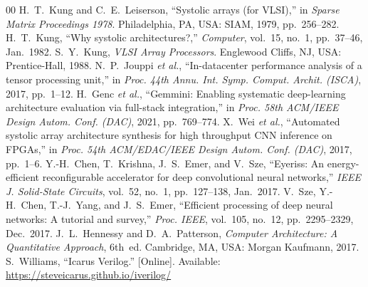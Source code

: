 \documentclass[conference]{IEEEtran}
\begin{document}
\begin{thebibliography}{00}
 H.~T.~Kung and C.~E.~Leiserson, ``Systolic arrays (for
VLSI),'' in \emph{Sparse Matrix Proceedings 1978}. Philadelphia, PA, USA: SIAM,
1979, pp.~256--282.
 H.~T.~Kung, ``Why systolic architectures?,''
\emph{Computer}, vol.~15, no.~1, pp.~37--46, Jan.~1982.
 S.~Y.~Kung, \emph{VLSI Array Processors}. Englewood Cliffs,
NJ, USA: Prentice-Hall, 1988.
 N.~P.~Jouppi \emph{et al.}, ``In-datacenter performance analysis
of a tensor processing unit,'' in \emph{Proc. 44th Annu. Int. Symp. Comput.
Archit. (ISCA)}, 2017, pp.~1--12.
 H.~Genc \emph{et al.}, ``Gemmini: Enabling systematic
deep-learning architecture evaluation via full-stack integration,'' in
\emph{Proc. 58th ACM/IEEE Design Autom. Conf. (DAC)}, 2021, pp.~769--774.
 X.~Wei \emph{et al.}, ``Automated systolic array architecture
synthesis for high throughput CNN inference on FPGAs,'' in \emph{Proc. 54th
ACM/EDAC/IEEE Design Autom. Conf. (DAC)}, 2017, pp.~1--6.
 Y.-H.~Chen, T.~Krishna, J.~S.~Emer, and V.~Sze, ``Eyeriss: An
energy-efficient reconfigurable accelerator for deep convolutional neural
networks,'' \emph{IEEE J. Solid-State Circuits}, vol.~52, no.~1, pp.~127--138,
Jan.~2017.
 V.~Sze, Y.-H.~Chen, T.-J.~Yang, and J.~S.~Emer, ``Efficient
processing of deep neural networks: A tutorial and survey,'' \emph{Proc. IEEE},
vol.~105, no.~12, pp.~2295--2329, Dec.~2017.
 J.~L.~Hennessy and D.~A.~Patterson, \emph{Computer
Architecture: A Quantitative Approach}, 6th~ed. Cambridge, MA, USA: Morgan
Kaufmann, 2017.
 S.~Williams, ``Icarus Verilog.'' [Online]. Available:
\url{https://steveicarus.github.io/iverilog/}
\end{thebibliography}
\end{document}
